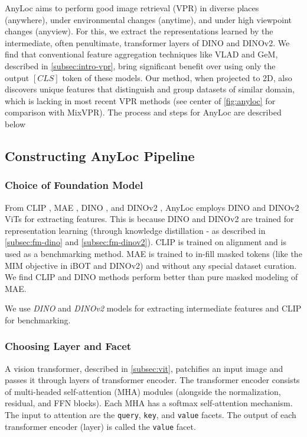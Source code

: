 AnyLoc aims to perform good image retrieval (VPR) in diverse places
(anywhere), under environmental changes (anytime), and under high
viewpoint changes (anyview). For this, we extract the representations
learned by the intermediate, often penultimate, transformer layers of
DINO and DINOv2. We find that conventional feature aggregation
techniques like VLAD and GeM, described in \cref{subsec:intro-vpr},
bring significant benefit over using only the output
$\left[CLS\right]$ token of these models. Our method, when projected
to 2D, also discovers unique features that distinguish and group
datasets of similar domain, which is lacking in most recent VPR
methods (see center of \cref{fig:anyloc} for comparison with MixVPR).
The process and steps for AnyLoc are described below

\subsection{Constructing AnyLoc Pipeline}

\subsubsection{Choice of Foundation Model}

From CLIP \cite{Radford2021LearningTV}, MAE \cite{He2021MaskedAA},
DINO \cite{Caron2021EmergingPI}, and DINOv2 \cite{Oquab2023DINOv2LR},
AnyLoc employs DINO and DINOv2 ViTs for extracting features. This is
because DINO and DINOv2 are trained for representation learning
(through knowledge distillation - as described in
\cref{subsec:fm-dino} and \cref{subsec:fm-dinov2}). CLIP is trained
on alignment and is used as a benchmarking method. MAE is trained to
in-fill masked tokens (like the MIM objective in iBOT and DINOv2) and 
without any special dataset curation. We find CLIP and DINO methods
perform better than pure masked modeling of MAE.

We use \emph{DINO} and \emph{DINOv2} models for extracting
intermediate features and CLIP for benchmarking.

\subsubsection{Choosing Layer and Facet}

A vision transformer, described in \cref{subsec:vit}, patchifies an
input image and passes it through layers of transformer encoder. The
transformer encoder consists of multi-headed self-attention (MHA)
modules (alongside the normalization, residual, and FFN blocks). Each
MHA has a softmax self-attention mechanism. The input to attention
are the \texttt{query}, \texttt{key}, and \texttt{value} facets. The
output of each transformer encoder (layer) is called the 
\texttt{value} facet.

